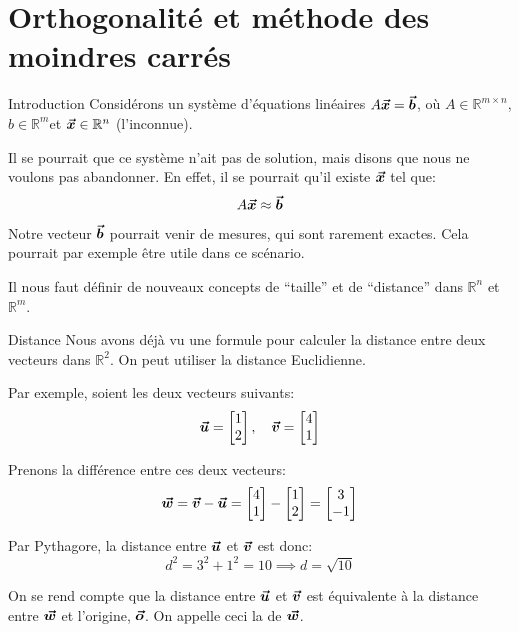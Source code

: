 \documentclass[a4paper]{article}
\begin{document}
\section{Orthogonalité et méthode des moindres carrés}
\begin{parag}{Introduction}
    Considérons un système d'équations linéaires $A \bm{\protect\vec{x}} = \bm{\protect\vec{b}}$, où $A \in \mathbb{R}^{m \times n}$, $b \in \mathbb{R}^{m}$et $\bm{\protect\vec{x}} \in \mathbb{R}^{n}$ (l'inconnue).

    Il se pourrait que ce système n'ait pas de solution, mais disons que nous ne voulons pas abandonner. En effet, il se pourrait qu'il existe $\bm{\protect\vec{x}}$ tel que:
    \[A \bm{\protect\vec{x}} \approx \bm{\protect\vec{b}}\]

    Notre vecteur $\bm{\protect\vec{b}}$ pourrait venir de mesures, qui sont rarement exactes. Cela pourrait par exemple être utile dans ce scénario.

    Il nous faut définir de nouveaux concepts de ``taille'' et de ``distance'' dans $\mathbb{R}^n$ et $\mathbb{R}^m$.
\end{parag}

\begin{parag}{Distance}
    Nous avons déjà vu une formule pour calculer la distance entre deux vecteurs dans $\mathbb{R}^2$. On peut utiliser la distance Euclidienne.

    Par exemple, soient les deux vecteurs suivants:
    \[\bm{\protect\vec{u}} = \begin{bmatrix} 1 \\ 2 \end{bmatrix}, \quad \bm{\protect\vec{v}} = \begin{bmatrix} 4 \\ 1 \end{bmatrix} \]


    Prenons la différence entre ces deux vecteurs:
    \[\bm{\protect\vec{w}} = \bm{\protect\vec{v}} - \bm{\protect\vec{u}} = \begin{bmatrix} 4 \\ 1 \end{bmatrix} - \begin{bmatrix} 1 \\ 2 \end{bmatrix} = \begin{bmatrix} 3 \\ -1 \end{bmatrix} \]

    Par Pythagore, la distance entre $\bm{\protect\vec{u}}$ et $\bm{\protect\vec{v}}$ est donc:
    \[d^2 = 3^2 + 1^2 = 10 \implies d = \sqrt{10}\]

    On se rend compte que la distance entre $\bm{\protect\vec{u}}$ et $\bm{\protect\vec{v}}$ est équivalente à la distance entre $\bm{\protect\vec{w}}$ et l'origine, $\bm{\protect\vec{o}}$. On appelle ceci la  de $\bm{\protect\vec{w}}$.
\end{parag}
\end{document}

